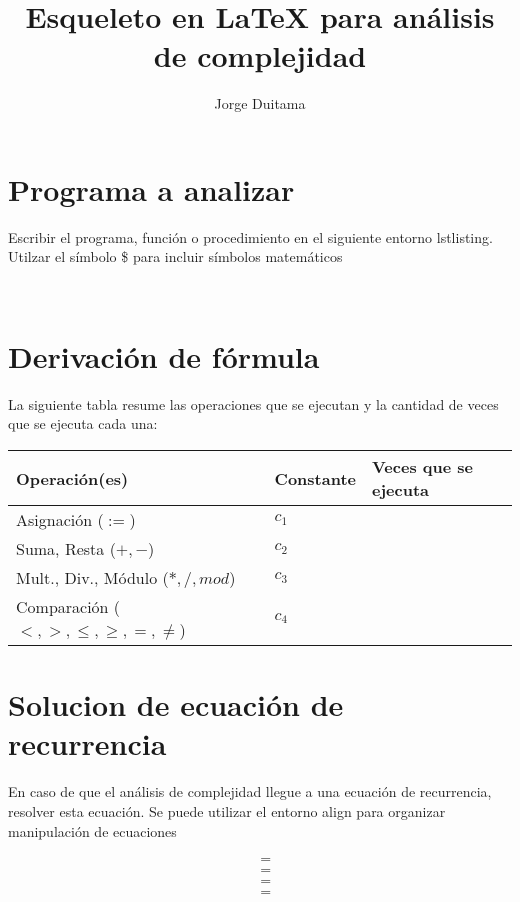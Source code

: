 \documentclass[]{article}
\begin{document}
	
	
\title{Esqueleto en LaTeX para análisis de complejidad}
	
\author{Jorge Duitama}
	
\maketitle

\section*{Programa a analizar}

Escribir el programa, función o procedimiento en el siguiente entorno lstlisting.
Utilzar el símbolo \$ para incluir símbolos matemáticos

\begin{lstlisting}[language=GCL, mathescape, tabsize=4]


\end{lstlisting}

\section*{Derivación de fórmula}
La siguiente tabla resume las operaciones que se ejecutan y la cantidad de veces que se ejecuta cada una:

\begin{table}[h!]
\begin{center}
\begin{tabular}{|l|l|l|}
\hline
\textbf{Operación(es)} & \textbf{Constante} & \textbf{Veces que se ejecuta} \\
\hline
Asignación ($:=$) & $c_1$ & $ $ \\
Suma, Resta ($+,-$) & $c_2$ & $ $ \\
Mult., Div., Módulo  ($*,/,mod$) & $c_3$ & $ $ \\
Comparación ($<,>,\leq,\geq,=,\neq$) & $c_4$ & $ $ \\
\hline
\end{tabular}
\end{center}
\end{table}

\section*{Solucion de ecuación de recurrencia}
En caso de que el análisis de complejidad llegue a una ecuación de recurrencia, resolver esta ecuación. Se puede utilizar el entorno align para organizar manipulación de ecuaciones


\begin{align*}
 &=  \\	
 &=  \\
 &= \\
 &= \\
& 
\end{align*}
\end{document}
